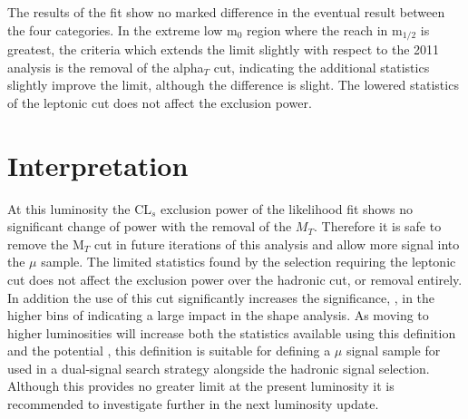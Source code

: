The results of the fit show no marked difference in the eventual result between the four categories. In the extreme low m$_{0}$ region where the reach in m$_{1/2}$ is greatest, the criteria which extends the limit slightly with respect to the 2011 analysis is the removal of the alpha$_{T}$ cut, indicating the additional statistics slightly improve the limit, although the difference is slight. The lowered statistics of the leptonic \altl cut does not affect the exclusion power. 

\section{Interpretation}

At this luminosity the CL$_{s}$ exclusion power of the likelihood fit shows no significant change of power with the removal of the $M_{T}$. Therefore it is safe to remove the M$_{T}$ cut in future iterations of this analysis and allow more signal into the $\mu$ sample.  The limited statistics found by the selection requiring the leptonic \alt cut does not affect the exclusion power over the hadronic cut, or removal entirely. In addition the use of this cut significantly increases the significance, \srb, in the higher bins of \HT indicating a large impact in the shape analysis. As moving to higher luminosities will increase both the statistics available using this definition and the potential \srb, this definition is suitable for defining a $\mu$ signal sample for used in a dual-signal search strategy alongside the hadronic signal selection. Although this provides no greater limit at the present luminosity it is recommended to investigate further in the next luminosity update.


